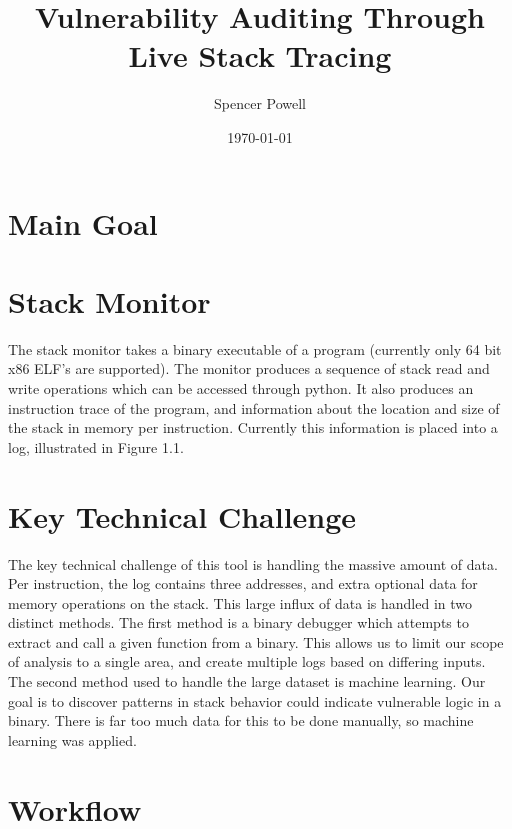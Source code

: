\documentclass{article}
\title{Vulnerability Auditing Through Live Stack Tracing}
\author{Spencer Powell}
\date{\today}
\begin{document}
\maketitle

\section{Main Goal}

\section{Stack Monitor}

The stack monitor takes a binary executable of a program (currently only 64 bit x86 ELF's are supported). The monitor produces a sequence of stack read and write operations which can be accessed through python. It also produces an instruction trace of the program, and information about the location and size of the stack in memory per instruction. Currently this information is placed into a log, illustrated in Figure 1.1.

\section{Key Technical Challenge}

The key technical challenge of this tool is handling the massive amount of data. Per instruction, the log contains three addresses, and extra optional data for memory operations on the stack. This large influx of data is handled in two distinct methods. The first method is a binary debugger which attempts to extract and call a given function from a binary. This allows us to limit our scope of analysis to a single area, and create multiple logs based on differing inputs. The second method used to handle the large dataset is machine learning. Our goal is to discover patterns in stack behavior could indicate vulnerable logic in a binary. There is far too much data for this to be done manually, so machine learning was applied.

\section{Workflow}
\end{document}
